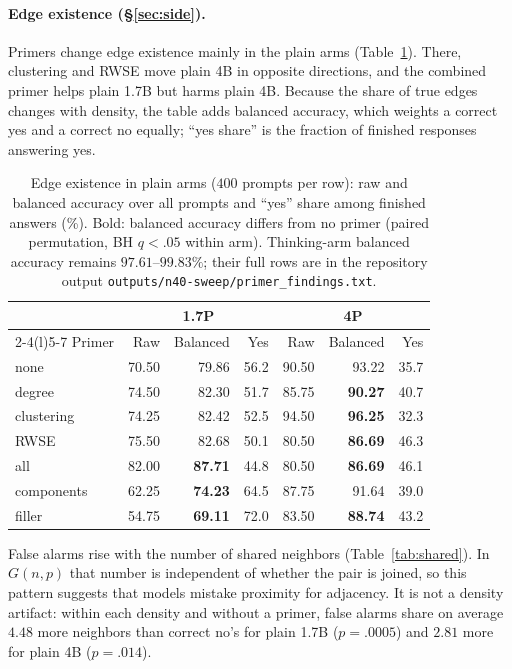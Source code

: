 \documentclass[11pt]{article}
\begin{document}
\paragraph{Edge existence (\S\ref{sec:side}).} Primers change edge existence mainly in the plain arms (Table~\ref{tab:ee}). There, clustering and RWSE move plain 4B in opposite directions, and the combined primer helps plain 1.7B but harms plain 4B. Because the share of true edges changes with density, the table adds balanced accuracy, which weights a correct yes and a correct no equally; ``yes share'' is the fraction of finished responses answering yes. %
\begin{table}[H]
\centering\scriptsize\setlength{\tabcolsep}{3pt}
\begin{tabular}{@{}lrrrrrr@{}}
\toprule
 & \multicolumn{3}{c}{1.7P} & \multicolumn{3}{c}{4P}\\
\cmidrule(lr){2-4}\cmidrule(l){5-7}
Primer & Raw & Balanced & Yes & Raw & Balanced & Yes\\
\midrule
none & 70.50 & 79.86 & 56.2 & 90.50 & 93.22 & 35.7\\ %
degree & 74.50 & 82.30 & 51.7 & 85.75 & \textbf{90.27} & 40.7\\ %
clustering & 74.25 & 82.42 & 52.5 & 94.50 & \textbf{96.25} & 32.3\\ %
RWSE & 75.50 & 82.68 & 50.1 & 80.50 & \textbf{86.69} & 46.3\\ %
all & 82.00 & \textbf{87.71} & 44.8 & 80.50 & \textbf{86.69} & 46.1\\ %
components & 62.25 & \textbf{74.23} & 64.5 & 87.75 & 91.64 & 39.0\\ %
filler & 54.75 & \textbf{69.11} & 72.0 & 83.50 & \textbf{88.74} & 43.2\\ %
\bottomrule
\end{tabular}
\caption{Edge existence in plain arms ($400$ prompts per row): raw and balanced accuracy over all prompts and ``yes'' share among finished answers (\%). Bold: balanced accuracy differs from no primer (paired permutation, BH $q<.05$ within arm). Thinking-arm balanced accuracy remains $97.61$--$99.83\%$; their full rows are in the repository output \texttt{outputs/n40-sweep/}\allowbreak\texttt{primer\_findings.txt}.} %
\label{tab:ee}
\end{table}
False alarms rise with the number of shared neighbors (Table~\ref{tab:shared}). In $G(n,p)$ that number is independent of whether the pair is joined, so this pattern suggests that models mistake proximity for adjacency. It is not a density artifact: within each density and without a primer, false alarms share on average $4.48$ more neighbors than correct no's for plain 1.7B ($p=.0005$) and $2.81$ more for plain 4B ($p=.014$). %
\end{document}
